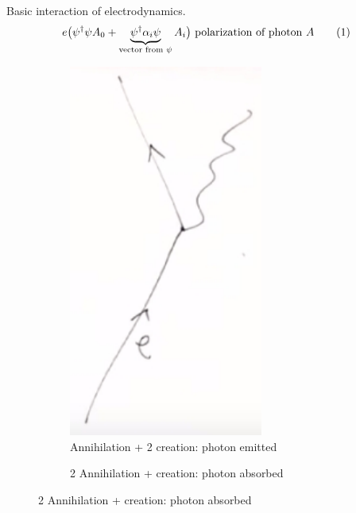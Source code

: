\documentclass[]{article}
\newcommand\numberthis{\addtocounter{equation}{1}\tag{\theequation}}
\begin{document}
Basic interaction of electrodynamics.
\begin{align*}
	e \big( \psi^\dagger \psi A_0 + 	\underbrace{\psi^\dagger \alpha_i  \psi}_\text{vector from $\psi$} A_i \big) \text{ polarization of photon $A$} \numberthis \label{eq:basic:interaction}
\end{align*}

\begin{figure}[H]
	\caption{Interactions arising from Lagrangian (\ref{eq:basic:interaction})}
	\begin{subfigure}{0.48\textwidth}
		\caption{Annihilation + 2 creation: photon emitted}
		\includegraphics[width=0.7\textwidth]{em-dirac1}
	\end{subfigure}
	\begin{subfigure}{0.48\textwidth}
		\caption{2 Annihilation +  creation: photon absorbed}

\end{subfigure}
\end{figure}
\end{document}
